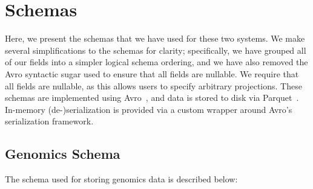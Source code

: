 \documentclass{acm_proc_article-sp}
\begin{document}
\balance

\clearpage

\appendix


 

\section{Schemas}
\label{sec:schema}

Here, we present the schemas that we have used for these two systems. We make several
simplifications to the schemas for clarity; specifically, we have grouped all of our fields into a simpler
logical schema ordering, and we have also removed the Avro syntactic sugar used to ensure that all
fields are nullable. We require that all fields are nullable, as this allows users to specify arbitrary projections.
These schemas are implemented using Avro~\cite{avro}, and data is stored to disk via
Parquet~\cite{parquet}. In-memory (de-)serialization is provided via a custom wrapper around Avro's
serialization framework.

\subsection{Genomics Schema}
\label{sec:genomics-schema}

The schema used for storing genomics data is described below:
\end{document}
